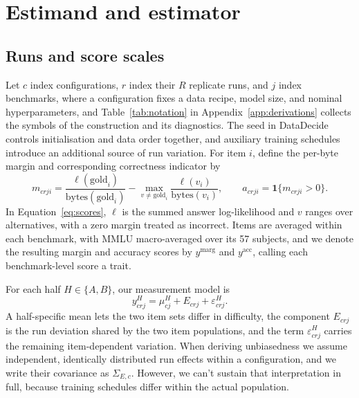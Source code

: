 \section{Estimand and estimator}
\label{sec:estimator}
\subsection{Runs and score scales}
Let $c$ index configurations, $r$ index their $R$ replicate runs, and $j$ index benchmarks, where a configuration fixes a data recipe, model size, and nominal hyperparameters, and Table~\ref{tab:notation} in Appendix~\ref{app:derivations} collects the symbols of the construction and its diagnostics. The seed in DataDecide controls initialisation and data order together, and auxiliary training schedules introduce an additional source of run variation. For item $i$, define the per-byte margin and corresponding correctness indicator by
\begin{equation}
m_{crji}=\frac{\ell(\mathrm{gold}_i)}{\mathrm{bytes}(\mathrm{gold}_i)}-
\max_{v\ne\mathrm{gold}_i}\frac{\ell(v_i)}{\mathrm{bytes}(v_i)},
\qquad a_{crji}=\mathbf{1}\{m_{crji}>0\}.
\label{eq:scores}
\end{equation}
In Equation~\ref{eq:scores}, $\ell$ is the summed answer log-likelihood and $v$ ranges over alternatives, with a zero margin treated as incorrect. Items are averaged within each benchmark, with MMLU macro-averaged over its 57 subjects, and we denote the resulting margin and accuracy scores by $y^{\mathrm{marg}}$ and $y^{\mathrm{acc}}$, calling each benchmark-level score a trait.

For each half $H\in\{A,B\}$, our measurement model is
\begin{equation}
y^H_{crj}=\mu^H_{cj}+E_{crj}+\varepsilon^H_{crj}.
\end{equation}
A half-specific mean lets the two item sets differ in difficulty, the component $E_{crj}$ is the run deviation shared by the two item populations, and the term $\varepsilon^H_{crj}$ carries the remaining item-dependent variation. When deriving unbiasedness we assume independent, identically distributed run effects within a configuration, and we write their covariance as $\Sigma_{E,c}$. However, we can't sustain that interpretation in full, because training schedules differ within the actual population.

